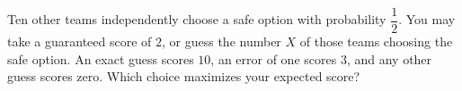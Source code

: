 Ten other teams independently choose a safe option with probability $\dfrac{1}{2}$. You may take a guaranteed score of $2$, or guess the number $X$ of those teams choosing the safe option. An exact guess scores $10$, an error of one scores $3$, and any other guess scores zero. Which choice maximizes your expected score?
